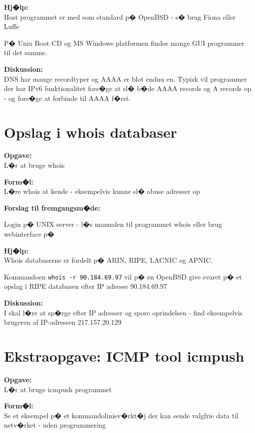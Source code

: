 \documentclass[a4paper,11pt,notitlepage]{oevelser}
\begin{document}
{\bfseries Hj�lp:}\\
Host programmet er med som standard p� OpenBSD - s� brug Fiona eller Luffe

P� Unix Boot CD og MS Windows platformen findes mange GUI programmer til det samme.

{\bfseries Diskussion:}\\
DNS har mange recordtyper og AAAA er blot endnu en. Typisk vil programmer der har IPv6 funktionalitet fors�ge at sl� b�de AAAA records og A records op - og fors�ge at forbinde til AAAA f�rst.


\chapter{Opslag i whois databaser}
\label{ex:whois}


{\bfseries Opgave:} \\
L�r at bruge whois

{\bfseries Form�l:}\\
L�re whois at kende - eksempelvis kunne sl� abuse adresser op

{\bfseries Forslag til fremgangsm�de:}\\
\begin{list2}
\item Login p� UNIX server - l�s manualen til programmet whois
eller brug webinterface p�\\ 
\end{list2}

{\bfseries Hj�lp:}\\
Whois databaserne er fordelt p� ARIN, RIPE, LACNIC og APNIC.

Kommandoen \verb+whois -r 90.184.69.97+ vil p� en OpenBSD give
svaret p� et opslag i RIPE databasen efter IP adresse 90.184.69.97

{\bfseries Diskussion:}\\
I skal l�re at sp�rge efter IP adresser og spore oprindelsen - find
eksempelvis brugeren af IP-adressen 217.157.20.129


\chapter{Ekstraopgave: ICMP tool icmpush}
\label{ex:icmpush}

{\bfseries Opgave:} \\
L�r at bruge icmpush programmet

{\bfseries Form�l:}\\
Se et eksempel p� et kommandoliniev�rkt�j der kan sende valgfrie data til netv�rket - uden programmering
\end{document}
